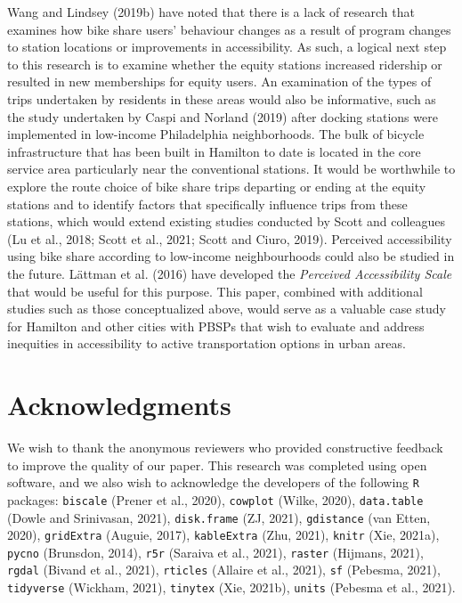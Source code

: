 \documentclass[]{elsarticle} %
\begin{document}
Wang and Lindsey (2019b) have noted that there is a lack of research
that examines how bike share users' behaviour changes as a result of
program changes to station locations or improvements in accessibility.
As such, a logical next step to this research is to examine whether the
equity stations increased ridership or resulted in new memberships for
equity users. An examination of the types of trips undertaken by
residents in these areas would also be informative, such as the study
undertaken by Caspi and Norland (2019) after docking stations were
implemented in low-income Philadelphia neighborhoods. The bulk of
bicycle infrastructure that has been built in Hamilton to date is
located in the core service area particularly near the conventional
stations. It would be worthwhile to explore the route choice of bike
share trips departing or ending at the equity stations and to identify
factors that specifically influence trips from these stations, which
would extend existing studies conducted by Scott and colleagues (Lu et
al., 2018; Scott et al., 2021; Scott and Ciuro, 2019). Perceived
accessibility using bike share according to low-income neighbourhoods
could also be studied in the future. Lättman et al. (2016) have
developed the \emph{Perceived Accessibility Scale} that would be useful
for this purpose. This paper, combined with additional studies such as
those conceptualized above, would serve as a valuable case study for
Hamilton and other cities with PBSPs that wish to evaluate and address
inequities in accessibility to active transportation options in urban
areas.

\hypertarget{acknowledgments}{%
\section{Acknowledgments}\label{acknowledgments}}

We wish to thank the anonymous reviewers who provided constructive
feedback to improve the quality of our paper. This research was
completed using open software, and we also wish to acknowledge the
developers of the following \texttt{R} packages: \texttt{biscale}
(Prener et al., 2020), \texttt{cowplot} (Wilke, 2020),
\texttt{data.table} (Dowle and Srinivasan, 2021), \texttt{disk.frame}
(ZJ, 2021), \texttt{gdistance} (van Etten, 2020), \texttt{gridExtra}
(Auguie, 2017), \texttt{kableExtra} (Zhu, 2021), \texttt{knitr} (Xie,
2021a), \texttt{pycno} (Brunsdon, 2014), \texttt{r5r} (Saraiva et al.,
2021), \texttt{raster} (Hijmans, 2021), \texttt{rgdal} (Bivand et al.,
2021), \texttt{rticles} (Allaire et al., 2021), \texttt{sf} (Pebesma,
2021), \texttt{tidyverse} (Wickham, 2021), \texttt{tinytex} (Xie,
2021b), \texttt{units} (Pebesma et al., 2021).
\end{document}
